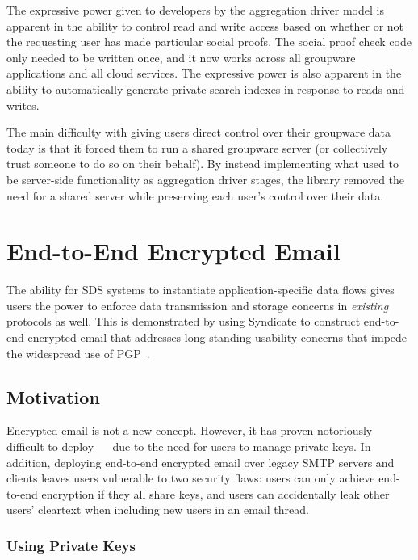 The expressive power given to developers by the aggregation driver model is
apparent in the ability to control read and write access based on whether or not
the requesting user has made particular social proofs.  The social proof check
code only needed to be written once, and it now works across all groupware
applications and all cloud services.  The expressive power is also apparent in
the ability to automatically generate private search indexes in response to reads and
writes.

The main difficulty with giving users direct control over their groupware data
today is that it forced them to run a shared groupware server (or collectively
trust someone to do so on their behalf).  By instead
implementing what used to be server-side functionality as aggregation driver
stages, the library removed the need for a shared server while preserving each
user's control over their data.

\section{End-to-End Encrypted Email}

The ability for SDS systems to instantiate application-specific data flows gives
users the power to enforce data transmission and storage concerns in
\emph{existing} protocols as well.  This is demonstrated by using Syndicate to construct
end-to-end encrypted email that addresses long-standing
usability concerns that impede the widespread use of PGP~\cite{pgp}.

\subsection{Motivation}

Encrypted email is not a new concept.  However, it has proven notoriously difficult to
deploy~\cite{why-johnny-cant-encrypt}
~\cite{why-johnny-still-still-cant-encrypt} due to the need for users to manage
private keys.  In addition, deploying end-to-end encrypted email over legacy
SMTP servers and clients leaves users vulnerable to two security flaws:  users
can only achieve end-to-end encryption if they all share keys, and users can
accidentally leak other users' cleartext when including new users in an email
thread.

\subsubsection{Using Private Keys}

